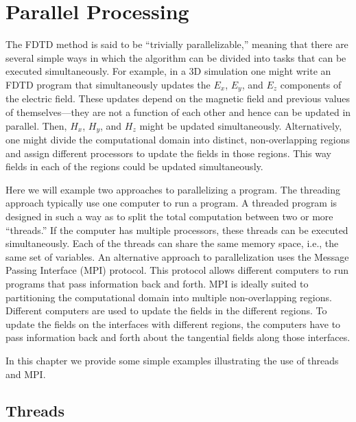 \chapter[Parallel Processing]{Parallel Processing \label{chap:parallel}}


\renewcommand{\thefootnote}{\fnsymbol{footnote}}

The FDTD method is said to be ``trivially parallelizable,'' meaning
that there are several simple ways in which the algorithm can be
divided into tasks that can be executed simultaneously.  For example,
in a 3D simulation one might write an FDTD program that simultaneously
updates the $E_x$, $E_y$, and $E_z$ components of the electric field.
These updates depend on the magnetic field and previous values of
themselves---they are not a function of each other and hence can be
updated in parallel.  Then, $H_x$, $H_y$, and $H_z$ might be updated
simultaneously.  Alternatively, one might divide the computational
domain into distinct, non-overlapping regions and assign different
processors to update the fields in those regions.  This way fields in
each of the regions could be updated simultaneously.

Here we will example two approaches to parallelizing a program.  The
threading approach typically use one computer to run a program.  A
threaded program is designed in such a way as to split the total
computation between two or more ``threads.''  If the computer has
multiple processors, these threads can be executed simultaneously.
Each of the threads can share the same memory space, i.e., the same
set of variables.  An alternative approach to parallelization uses the
Message Passing Interface (MPI) protocol.  This protocol allows
different computers to run programs that pass information back and
forth.  MPI is ideally suited to partitioning the computational domain
into multiple non-overlapping regions.  Different computers are used
to update the fields in the different regions.  To update the fields
on the interfaces with different regions, the computers have to pass
information back and forth about the tangential fields along those
interfaces.

In this chapter we provide some simple examples illustrating the use
of threads and MPI.

\section{Threads}

